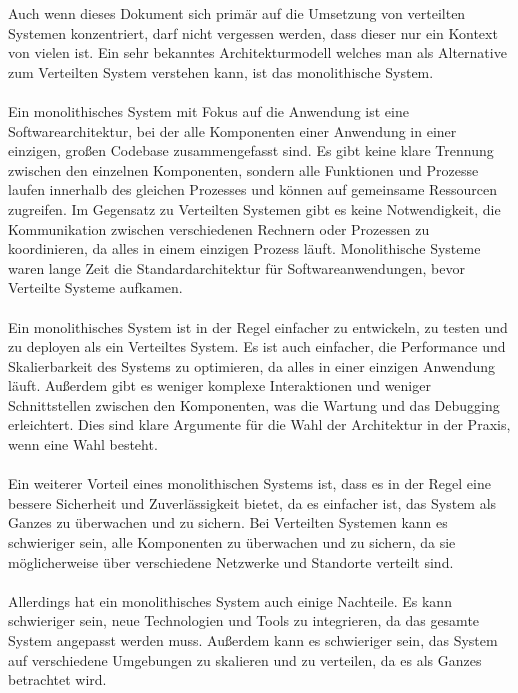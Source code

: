 Auch wenn dieses Dokument sich primär auf die Umsetzung von verteilten Systemen konzentriert, darf nicht vergessen werden, dass dieser nur ein Kontext von vielen ist. Ein sehr bekanntes Architekturmodell welches man als Alternative zum Verteilten System verstehen kann, ist das monolithische System\cite{Newman2015}. 
\\\\
Ein monolithisches System mit Fokus auf die Anwendung\cite{Szyperski2002} ist eine Softwarearchitektur, bei der alle Komponenten einer Anwendung in einer einzigen, großen Codebase zusammengefasst sind. Es gibt keine klare Trennung zwischen den einzelnen Komponenten, sondern alle Funktionen und Prozesse laufen innerhalb des gleichen Prozesses und können auf gemeinsame Ressourcen zugreifen. Im Gegensatz zu Verteilten Systemen gibt es keine Notwendigkeit, die Kommunikation zwischen verschiedenen Rechnern oder Prozessen zu koordinieren, da alles in einem einzigen Prozess läuft. Monolithische Systeme waren lange Zeit die Standardarchitektur für Softwareanwendungen, bevor Verteilte Systeme aufkamen.
\\\\
Ein monolithisches System ist in der Regel einfacher zu entwickeln, zu testen und zu deployen als ein Verteiltes System. Es ist auch einfacher, die Performance und Skalierbarkeit des Systems zu optimieren, da alles in einer einzigen Anwendung läuft. Außerdem gibt es weniger komplexe Interaktionen und weniger Schnittstellen zwischen den Komponenten, was die Wartung und das Debugging erleichtert. Dies sind klare Argumente für die Wahl der Architektur in der Praxis, wenn eine Wahl besteht. 
\\\\
Ein weiterer Vorteil eines monolithischen Systems ist, dass es in der Regel eine bessere Sicherheit und Zuverlässigkeit bietet, da es einfacher ist, das System als Ganzes zu überwachen und zu sichern. Bei Verteilten Systemen kann es schwieriger sein, alle Komponenten zu überwachen und zu sichern, da sie möglicherweise über verschiedene Netzwerke und Standorte verteilt sind.
\\\\
Allerdings hat ein monolithisches System auch einige Nachteile. Es kann schwieriger sein, neue Technologien und Tools zu integrieren, da das gesamte System angepasst werden muss. Außerdem kann es schwieriger sein, das System auf verschiedene Umgebungen zu skalieren und zu verteilen, da es als Ganzes betrachtet wird.
\\\\
